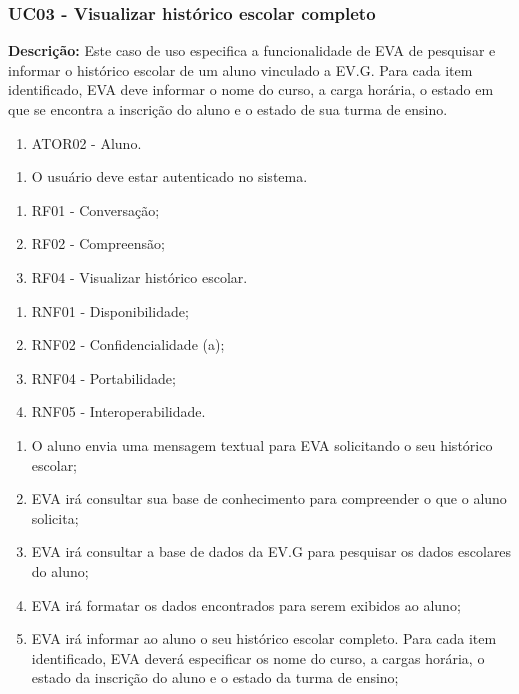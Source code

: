 \subsubsection{UC03 - Visualizar histórico escolar completo}

\textbf{Descrição:} Este caso de uso especifica a funcionalidade de EVA de pesquisar e informar o histórico escolar de um aluno vinculado a EV.G. Para cada item identificado, EVA deve informar o nome do curso, a carga horária, o estado em que se encontra a inscrição do aluno e o estado de sua turma de ensino. 

    \begin{enumerate}[label=\alph*)]
        \tightlist
        \item ATOR02 - Aluno.
    \end{enumerate}
        
    \begin{enumerate}[label=\alph*)]
        \tightlist
        \item O usuário deve estar autenticado no sistema.
    \end{enumerate}
        
    \begin{enumerate}[label=\alph*)]
        \tightlist
        \item RF01 - Conversação;
        \item RF02 - Compreensão;
        \item RF04 - Visualizar histórico escolar.
    \end{enumerate}
        
    \begin{enumerate}[label=\alph*)]
        \tightlist
        \item RNF01 - Disponibilidade;
        \item RNF02 - Confidencialidade (a);
        \item RNF04 - Portabilidade;
        \item RNF05 - Interoperabilidade.
    \end{enumerate}
        
    \begin{enumerate}[label=\alph*)]
        \tightlist
        \item O aluno envia uma mensagem textual para EVA solicitando o seu histórico escolar;
        \item EVA irá consultar sua base de conhecimento para compreender o que o aluno solicita;
        \item EVA irá consultar a base de dados da EV.G para pesquisar os dados escolares do aluno;
        \item EVA irá formatar os dados encontrados para serem exibidos ao aluno;
        \item EVA irá informar ao aluno o seu histórico escolar completo. Para cada item identificado, EVA deverá especificar os nome do curso, a cargas horária, o estado da inscrição do aluno e o estado da turma de ensino;
    \end{enumerate}
        
